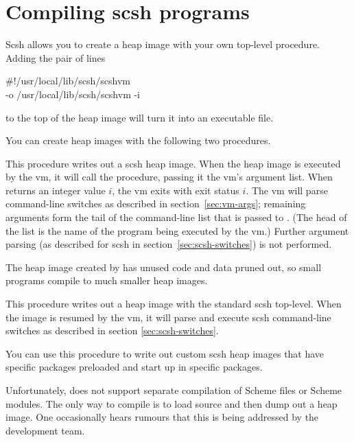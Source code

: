\section{Compiling scsh programs}
Scsh allows you to create a heap image with your own top-level procedure.
Adding the pair of lines
\begin{code}
#!/usr/local/lib/scsh/scshvm \\
-o /usr/local/lib/scsh/scshvm -i\end{code}
to the top of the heap image will turn it into an executable {\Unix} file.

You can create heap images with the following two procedures.

\begin{desc}
    This procedure writes out a scsh heap image. When the
    heap image is executed by the {\scm} vm, it will call
    the  procedure, passing it the vm's argument list.
    When  returns an integer value $i$, the vm exits with
    exit status $i$.
    The {\Scheme} vm will parse command-line switches as
    described in section~\ref{sec:vm-args}; remaining arguments
    form the tail of the command-line list that is passed to .
    (The head of the list is the name of the program being executed
    by the vm.)
    Further argument parsing
    (as described for scsh in section~\ref{sec:scsh-switches})
    is not performed.

    The heap image created by  has unused
    code and data pruned out, so small programs compile to much smaller
    heap images.
\end{desc}

\begin{desc}
    This procedure writes out a heap image with the standard 
    scsh top-level.
    When the image is resumed by the vm, it will parse and
    execute scsh command-line switches as described in section 
    \ref{sec:scsh-switches}.

    You can use this procedure to write out custom scsh heap images
    that have specific packages preloaded and start up in specific
    packages.
\end{desc}

Unfortunately, {\scm} does not support separate compilation of
Scheme files or Scheme modules.
The only way to compile is to load source and then dump out a
heap image.
One occasionally hears rumours that this is being addressed
by the {\scm} development team.

